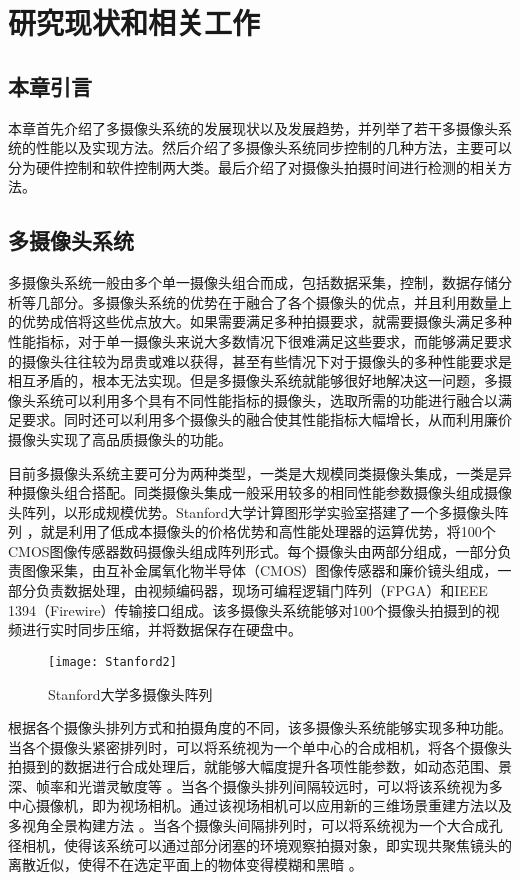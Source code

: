 \chapter{研究现状和相关工作}

\section{本章引言}

本章首先介绍了多摄像头系统的发展现状以及发展趋势，并列举了若干多摄像头系统的性能以及实现方法。然后介绍了多摄像头系统同步控制的几种方法，主要可以分为硬件控制和软件控制两大类。最后介绍了对摄像头拍摄时间进行检测的相关方法。

\section{多摄像头系统}

多摄像头系统一般由多个单一摄像头组合而成，包括数据采集，控制，数据存储分析等几部分。多摄像头系统的优势在于融合了各个摄像头的优点，并且利用数量上的优势成倍将这些优点放大。如果需要满足多种拍摄要求，就需要摄像头满足多种性能指标，对于单一摄像头来说大多数情况下很难满足这些要求，而能够满足要求的摄像头往往较为昂贵或难以获得，甚至有些情况下对于摄像头的多种性能要求是相互矛盾的，根本无法实现。但是多摄像头系统就能够很好地解决这一问题，多摄像头系统可以利用多个具有不同性能指标的摄像头，选取所需的功能进行融合以满足要求。同时还可以利用多个摄像头的融合使其性能指标大幅增长，从而利用廉价摄像头实现了高品质摄像头的功能。

目前多摄像头系统主要可分为两种类型，一类是大规模同类摄像头集成，一类是异种摄像头组合搭配。同类摄像头集成一般采用较多的相同性能参数摄像头组成摄像头阵列，以形成规模优势。Stanford大学计算图形学实验室搭建了一个多摄像头阵列 \cite{3}，就是利用了低成本摄像头的价格优势和高性能处理器的运算优势，将100个CMOS图像传感器数码摄像头组成阵列形式。每个摄像头由两部分组成，一部分负责图像采集，由互补金属氧化物半导体（CMOS）图像传感器和廉价镜头组成，一部分负责数据处理，由视频编码器，现场可编程逻辑门阵列（FPGA）和IEEE 1394（Firewire）传输接口组成。该多摄像头系统能够对100个摄像头拍摄到的视频进行实时同步压缩，并将数据保存在硬盘中。

\begin{figure}[h] 
  \centering
  \texttt{[image: Stanford2]}
  \caption{Stanford大学多摄像头阵列}
  \label{Stanford2}
\end{figure}

根据各个摄像头排列方式和拍摄角度的不同，该多摄像头系统能够实现多种功能。当各个摄像头紧密排列时，可以将系统视为一个单中心的合成相机，将各个摄像头拍摄到的数据进行合成处理后，就能够大幅度提升各项性能参数，如动态范围、景深、帧率和光谱灵敏度等 \cite{4, 7}。当各个摄像头排列间隔较远时，可以将该系统视为多中心摄像机，即为视场相机。通过该视场相机可以应用新的三维场景重建方法以及多视角全景构建方法 \cite{5}。当各个摄像头间隔排列时，可以将系统视为一个大合成孔径相机，使得该系统可以通过部分闭塞的环境观察拍摄对象，即实现共聚焦镜头的离散近似，使得不在选定平面上的物体变得模糊和黑暗 \cite{6, 8}。

